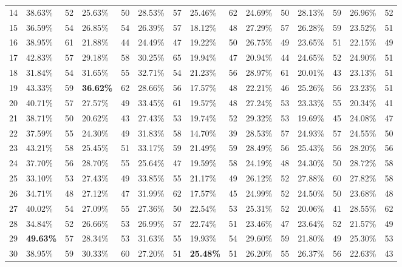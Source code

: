 \begin{tabular}{llrlrlrlrlrlrlr}
14 & 38.63\% & 52 & 25.63\% & 50 & 28.53\% & 57 & 25.46\% & 62 & 24.69\% & 50 & 28.13\% & 59 & 26.96\% & 52 \\
15 & 36.59\% & 54 & 26.85\% & 54 & 26.39\% & 57 & 18.12\% & 48 & 27.29\% & 57 & 26.28\% & 59 & 23.52\% & 51 \\
16 & 38.95\% & 61 & 21.88\% & 44 & 24.49\% & 47 & 19.22\% & 50 & 26.75\% & 49 & 23.65\% & 51 & 22.15\% & 49 \\
17 & 42.83\% & 57 & 29.18\% & 58 & 30.25\% & 65 & 19.94\% & 47 & 20.94\% & 44 & 24.65\% & 52 & 24.90\% & 51 \\
18 & 31.84\% & 54 & 31.65\% & 55 & 32.71\% & 54 & 21.23\% & 56 & 28.97\% & 61 & 20.01\% & 43 & 23.13\% & 51 \\
19 & 43.33\% & 59 & \textbf{36.62\%} & 62 & 28.66\% & 56 & 17.57\% & 48 & 22.21\% & 46 & 25.26\% & 56 & 23.23\% & 51 \\
20 & 40.71\% & 57 & 27.57\% & 49 & 33.45\% & 61 & 19.57\% & 48 & 27.24\% & 53 & 23.33\% & 55 & 20.34\% & 41 \\
21 & 38.71\% & 50 & 20.62\% & 43 & 27.43\% & 53 & 19.74\% & 52 & 29.32\% & 53 & 19.69\% & 45 & 24.08\% & 47 \\
22 & 37.59\% & 55 & 24.30\% & 49 & 31.83\% & 58 & 14.70\% & 39 & 28.53\% & 57 & 24.93\% & 57 & 24.55\% & 50 \\
23 & 43.21\% & 58 & 25.45\% & 51 & 33.17\% & 59 & 21.49\% & 59 & 28.49\% & 56 & 25.43\% & 56 & 28.20\% & 56 \\
24 & 37.70\% & 56 & 28.70\% & 55 & 25.64\% & 47 & 19.59\% & 58 & 24.19\% & 48 & 24.30\% & 50 & 28.72\% & 58 \\
25 & 33.10\% & 53 & 27.43\% & 49 & 33.85\% & 55 & 21.17\% & 49 & 26.12\% & 52 & 27.88\% & 60 & 27.82\% & 58 \\
26 & 34.71\% & 48 & 27.12\% & 47 & 31.99\% & 62 & 17.57\% & 45 & 24.99\% & 52 & 24.50\% & 50 & 23.68\% & 48 \\
27 & 40.02\% & 54 & 27.09\% & 55 & 27.36\% & 50 & 22.54\% & 53 & 25.31\% & 52 & 20.06\% & 41 & 28.55\% & 62 \\
28 & 34.84\% & 52 & 26.66\% & 53 & 26.99\% & 57 & 22.74\% & 51 & 23.46\% & 47 & 23.64\% & 52 & 21.57\% & 49 \\
29 & \textbf{49.63\%} & 57 & 28.34\% & 53 & 31.63\% & 55 & 19.93\% & 54 & 29.60\% & 59 & 21.80\% & 49 & 25.30\% & 53 \\
30 & 38.95\% & 59 & 30.33\% & 60 & 27.20\% & 51 & \textbf{25.48\%} & 51 & 26.20\% & 55 & 26.37\% & 56 & 22.63\% & 43 \\
\bottomrule
\end{tabular}
